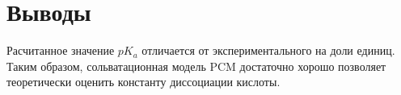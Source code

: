 \section{Выводы}
Расчитанное значение $pK_a$ отличается от экспериментального на доли единиц. Таким образом, сольватационная модель PCM достаточно хорошо позволяет теоретически оценить константу диссоциации кислоты. 